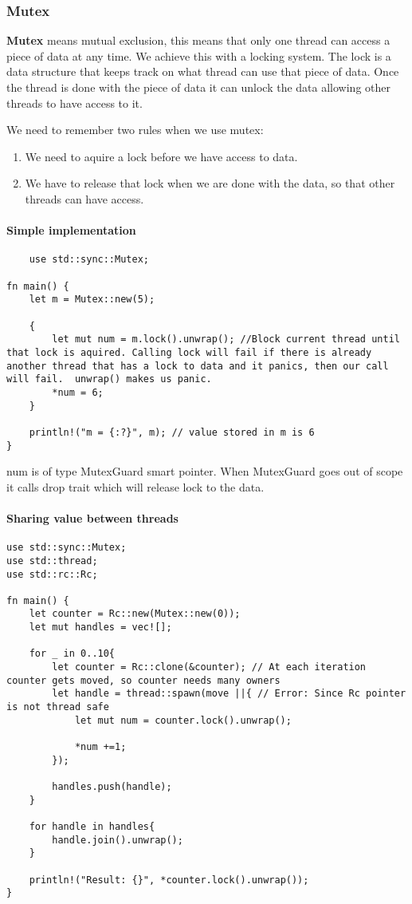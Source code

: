 \subsubsection{Mutex}
\begin{definition}
    \textbf{Mutex} means mutual exclusion, this means that only one thread can access a piece of data at any time. We achieve this with a locking system. The lock is a data structure that keeps track on what thread can use that piece of data. Once the thread is done with the piece of data it can unlock the data allowing other threads to have access to it.
\end{definition}
We need to remember two rules when we use mutex:\begin{enumerate}
    \item We need to aquire a lock before we have access to data.
    \item We have to release that lock when we are done with the data, so that other threads can have access.
\end{enumerate}

\paragraph*{Simple implementation}\begin{lstlisting}
    use std::sync::Mutex;

fn main() {
    let m = Mutex::new(5);

    {
        let mut num = m.lock().unwrap(); //Block current thread until that lock is aquired. Calling lock will fail if there is already another thread that has a lock to data and it panics, then our call will fail.  unwrap() makes us panic.
        *num = 6;
    }

    println!("m = {:?}", m); // value stored in m is 6
}
\end{lstlisting}
num is of type MutexGuard smart pointer. When MutexGuard goes out of scope it calls drop trait which will release lock to the data. 

\paragraph*{Sharing value between threads}\begin{lstlisting}
use std::sync::Mutex;
use std::thread;
use std::rc::Rc;

fn main() {
    let counter = Rc::new(Mutex::new(0));
    let mut handles = vec![];

    for _ in 0..10{
        let counter = Rc::clone(&counter); // At each iteration counter gets moved, so counter needs many owners
        let handle = thread::spawn(move ||{ // Error: Since Rc pointer is not thread safe
            let mut num = counter.lock().unwrap();

            *num +=1;
        });

        handles.push(handle);
    }

    for handle in handles{
        handle.join().unwrap();
    }

    println!("Result: {}", *counter.lock().unwrap());
}
\end{lstlisting}

